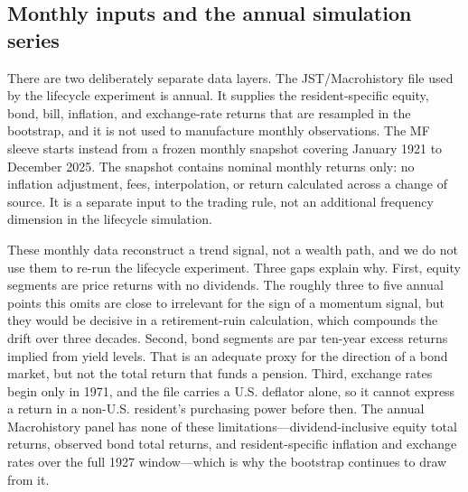 \documentclass[11pt]{article}
\begin{document}
\subsection{Monthly inputs and the annual simulation series}
\label{app:mf-monthly-data}

There are two deliberately separate data layers. The JST/Macrohistory file
used by the lifecycle experiment is annual. It supplies the resident-specific
equity, bond, bill, inflation, and exchange-rate returns that are resampled in
the bootstrap, and it is not used to manufacture monthly observations. The MF
sleeve starts instead from a frozen monthly snapshot covering January 1921 to
December 2025. The snapshot contains nominal monthly returns only: no
inflation adjustment, fees, interpolation, or return calculated across a
change of source. It is a separate input to the trading rule, not an
additional frequency dimension in the lifecycle simulation.

These monthly data reconstruct a trend signal, not a wealth path, and we do
not use them to re-run the lifecycle experiment. Three gaps explain why.
First, equity segments are price returns with no dividends. The roughly three
to five annual points this omits are close to irrelevant for the sign of a
momentum signal, but they would be decisive in a retirement-ruin calculation,
which compounds the drift over three decades. Second, bond segments are par
ten-year excess returns implied from yield levels. That is an adequate proxy
for the direction of a bond market, but not the total return that funds a
pension. Third, exchange rates begin only in 1971, and the file carries a
U.S. deflator alone, so it cannot express a return in a non-U.S. resident's
purchasing power before then. The annual Macrohistory panel has none of these
limitations---dividend-inclusive equity total returns, observed bond total
returns, and resident-specific inflation and exchange rates over the full 1927
window---which is why the bootstrap continues to draw from it.
\end{document}
